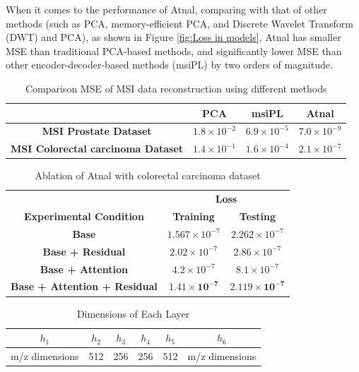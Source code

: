 \documentclass[journal=jacsat,manuscript=article]{achemso}
\begin{document}
When it comes to the performance of Atnal, comparing with that of other
methods (such as PCA, memory-efficient 
PCA, and Discrete Wavelet Transform (DWT) and PCA), 
as shown in Figure \ref{fig:Loss in models}, Atnal has smaller MSE than traditional 
PCA-based methods, and significantly lower MSE than other 
encoder-decoder-based methods (msiPL) by two orders of magnitude.
\begin{table}[htbp]
  \centering
  \caption{Comparison MSE of MSI data reconstruction using different methods}
  \label{tab:ablation_experiment}
  \begin{tabular}{cccc}
    \toprule
    & \textbf{PCA} & \textbf{msiPL} & \textbf{Atnal} \\
    \midrule
    \textbf{MSI Prostate Dataset} & $1.8 \times 10^{-2}$ & $6.9 \times 10^{-5}$ & $7.0 \times 10^{-9}$ \\
    \textbf{MSI Colorectal carcinoma Dataset} & $1.4 \times 10^{-1}$ & $1.6 \times 10^{-4}$ & $2.1 \times 10^{-7}$ \\
    \bottomrule
  \end{tabular}
\end{table}
\vspace{-10pt}
\begin{table}[htbp]
  \centering
  \caption{Ablation of Atnal with colorectal carcinoma dataset}
  \label{tab:ablation_experiment}
  \begin{tabular}{ccc}
    \toprule
    & \multicolumn{2}{c}{\textbf{Loss}} \\
    \cmidrule{2-3}
    \textbf{Experimental Condition} & \textbf{Training} & \textbf{Testing} \\
    \midrule
    \textbf{Base} & $1.567 \times 10^{-7}$ & $2.262 \times 10^{-7}$ \\
    \textbf{Base + Residual} & $2.02 \times 10^{-7}$ & $2.86 \times 10^{-7}$ \\
    \textbf{Base + Attention} & $4.2 \times 10^{-7}$ & $8.1 \times 10^{-7}$ \\
    \textbf{Base + Attention + Residual} & $\mathbf{1.41 \times 10^{-7}}$ & $\mathbf{2.119 \times 10^{-7}}$ \\
    \bottomrule
  \end{tabular}
\end{table}
\vspace{-10pt}
\begin{table}[htbp]
  \centering
  \caption{Dimensions of Each Layer}
  \begin{tabular}{cccccc}
    \toprule
    \textbf{$h_1$} & \textbf{$h_2$} & \textbf{$h_3$} & \textbf{$h_4$} & \textbf{$h_5$} & \textbf{$h_6$} \\
    \midrule
    m/z dimensions & 512 & 256 & 256 & 512 & m/z dimensions \\
    \bottomrule
  \end{tabular}
  \label{tbl:Dimensions of Each Layer}
\end{table}
\end{document}
